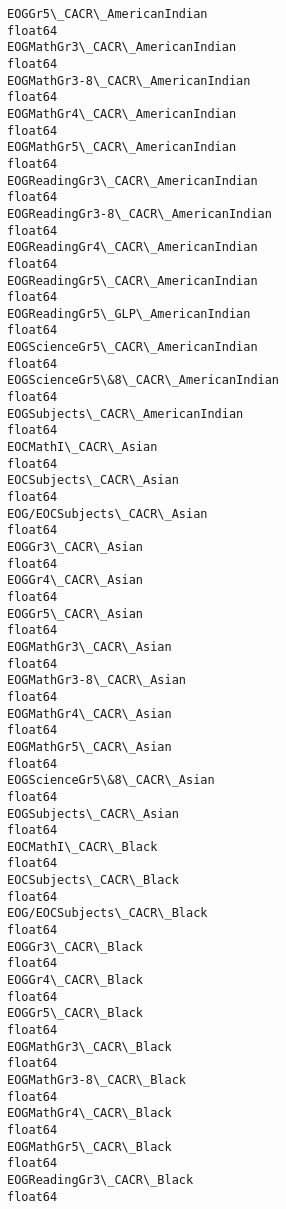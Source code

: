 \documentclass[11pt]{article}
\begin{document}
\begin{Verbatim}[commandchars=\\\{\}]
EOGGr5\_CACR\_AmericanIndian                                      float64
EOGMathGr3\_CACR\_AmericanIndian                                  float64
EOGMathGr3-8\_CACR\_AmericanIndian                                float64
EOGMathGr4\_CACR\_AmericanIndian                                  float64
EOGMathGr5\_CACR\_AmericanIndian                                  float64
EOGReadingGr3\_CACR\_AmericanIndian                               float64
EOGReadingGr3-8\_CACR\_AmericanIndian                             float64
EOGReadingGr4\_CACR\_AmericanIndian                               float64
EOGReadingGr5\_CACR\_AmericanIndian                               float64
EOGReadingGr5\_GLP\_AmericanIndian                                float64
EOGScienceGr5\_CACR\_AmericanIndian                               float64
EOGScienceGr5\&8\_CACR\_AmericanIndian                             float64
EOGSubjects\_CACR\_AmericanIndian                                 float64
EOCMathI\_CACR\_Asian                                             float64
EOCSubjects\_CACR\_Asian                                          float64
EOG/EOCSubjects\_CACR\_Asian                                      float64
EOGGr3\_CACR\_Asian                                               float64
EOGGr4\_CACR\_Asian                                               float64
EOGGr5\_CACR\_Asian                                               float64
EOGMathGr3\_CACR\_Asian                                           float64
EOGMathGr3-8\_CACR\_Asian                                         float64
EOGMathGr4\_CACR\_Asian                                           float64
EOGMathGr5\_CACR\_Asian                                           float64
EOGScienceGr5\&8\_CACR\_Asian                                      float64
EOGSubjects\_CACR\_Asian                                          float64
EOCMathI\_CACR\_Black                                             float64
EOCSubjects\_CACR\_Black                                          float64
EOG/EOCSubjects\_CACR\_Black                                      float64
EOGGr3\_CACR\_Black                                               float64
EOGGr4\_CACR\_Black                                               float64
EOGGr5\_CACR\_Black                                               float64
EOGMathGr3\_CACR\_Black                                           float64
EOGMathGr3-8\_CACR\_Black                                         float64
EOGMathGr4\_CACR\_Black                                           float64
EOGMathGr5\_CACR\_Black                                           float64
EOGReadingGr3\_CACR\_Black                                        float64

\end{Verbatim}
\end{document}
